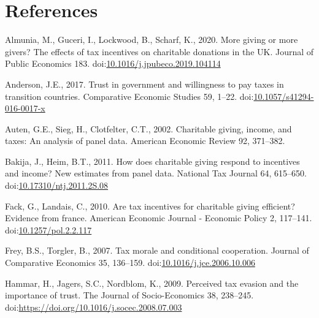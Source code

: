 \documentclass[
  11pt,
  a4paper,
]{article}
\newlength{\cslhangindent}
\newlength{\cslentryspacingunit} %
\newenvironment{CSLReferences}[2] %
 {%
  \setlength{\parindent}{0pt}
  \ifodd #1
  \let\oldpar\par
  \def\par{\hangindent=\cslhangindent\oldpar}
  \fi
  \setlength{\parskip}{#2\cslentryspacingunit}
 }%
 {}
\newlength{\cslhangindent}
\newenvironment{CSLReferences}[2] %
 {%
  \setlength{\parindent}{0pt}
  \ifodd #1 \everypar{\setlength{\hangindent}{\cslhangindent}}\ignorespaces\fi
  \ifnum #2 > 0
  \setlength{\parskip}{#2\baselineskip}
  \fi
 }%
 {}
\begin{document}
  \clearpage

  \hypertarget{references}{%
  \section*{References}\label{references}}

  \hypertarget{refs}{}
  \begin{CSLReferences}{1}{0}
  \leavevmode{}%
  Almunia, M., Guceri, I., Lockwood, B., Scharf, K., 2020. More giving or more givers? The effects of tax incentives on charitable donations in the UK. Journal of Public Economics 183. doi:\href{https://doi.org/10.1016/j.jpubeco.2019.104114}{10.1016/j.jpubeco.2019.104114}

  \leavevmode{}%
  Anderson, J.E., 2017. Trust in government and willingness to pay taxes in transition countries. Comparative Economic Studies 59, 1--22. doi:\href{https://doi.org/10.1057/s41294-016-0017-x}{10.1057/s41294-016-0017-x}

  \leavevmode{}%
  Auten, G.E., Sieg, H., Clotfelter, C.T., 2002. Charitable giving, income, and taxes: An analysis of panel data. American Economic Review 92, 371--382.

  \leavevmode{}%
  Bakija, J., Heim, B.T., 2011. How does charitable giving respond to incentives and income? New estimates from panel data. National Tax Journal 64, 615--650. doi:\href{https://doi.org/10.17310/ntj.2011.2S.08}{10.17310/ntj.2011.2S.08}

  \leavevmode{}%
  Fack, G., Landais, C., 2010. Are tax incentives for charitable giving efficient? Evidence from france. American Economic Journal - Economic Policy 2, 117--141. doi:\href{https://doi.org/10.1257/pol.2.2.117}{10.1257/pol.2.2.117}

  \leavevmode{}%
  Frey, B.S., Torgler, B., 2007. Tax morale and conditional cooperation. Journal of Comparative Economics 35, 136--159. doi:\href{https://doi.org/10.1016/j.jce.2006.10.006}{10.1016/j.jce.2006.10.006}

  \leavevmode{}%
  Hammar, H., Jagers, S.C., Nordblom, K., 2009. Perceived tax evasion and the importance of trust. The Journal of Socio-Economics 38, 238--245. doi:\url{https://doi.org/10.1016/j.socec.2008.07.003}


\end{CSLReferences}
\end{document}
